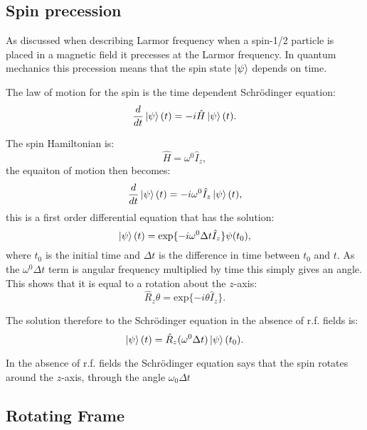 \subsection{Spin precession}

 As discussed when describing Larmor frequency when a spin-1/2 particle is placed in
 a magnetic field it precesses at the Larmor frequency. In quantum mechanics this precession
 means that the spin state $\ket{\psi}$ depends on time.

 The law of motion for the spin is the time dependent Schr\"odinger equation:
 \begin{equation}
   \frac{d}{dt}\ket{\psi}(t) = -i\hat{H}\ket{\psi}(t).
 \end{equation}

  The spin Hamiltonian is:
  \begin{equation}
    \hat{H} = \omega^0\hat{I}_z,
  \end{equation}
the equaiton of motion then becomes:
\begin{equation}
  \frac{d}{dt}\ket{\psi}(t) = -i\omega^0\hat{I}_z\ket{\psi}(t),
\end{equation}
this is a first order differential equation that has the solution:
\begin{equation}
  \ket{\psi}(t) = \text{exp}\{-i\omega^0\Delta{t}\hat{I}_z\}{\psi}(t_0),
\end{equation}
where $t_0$ is the initial time and $\Delta{t}$ is the difference in time
between $t_0$ and $t$. As the $\omega^0\Delta{t}$ term is angular frequency multiplied by
time this simply gives an angle. This shows that it is equal to a rotation about the $z$-axis:
\begin{equation}
  \hat{R}_z{\theta} = \text{exp}\{-i\theta\hat{I}_z\}.
\end{equation}

The solution therefore to the Schr\"odinger equation in the absence of r.f. fields is:
\begin{equation}
  \ket{\psi}(t) = \hat{R}_z(\omega^0\Delta{t})\ket{\psi}(t_0).
\end{equation}

In the absence of r.f. fields the Schr\"odinger equation says that the spin rotates
around the $z$-axis, through the angle $\omega_0\Delta{t}$

\subsection{Rotating Frame}

